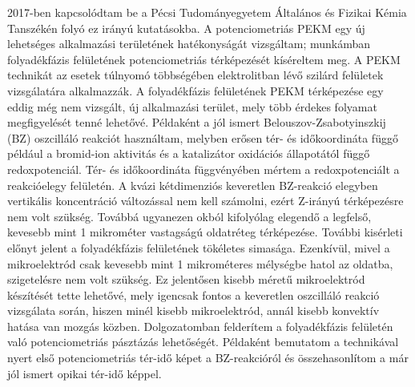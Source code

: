 2017-ben kapcsolódtam be a Pécsi Tudományegyetem Általános és Fizikai Kémia Tanszékén folyó ez irányú kutatásokba. A potenciometriás PEKM egy új lehetséges alkalmazási területének hatékonyságát vizsgáltam; munkámban folyadékfázis felületének potenciometriás térképezését kíséreltem meg. A PEKM technikát az esetek túlnyomó többségében elektrolitban lévő szilárd felületek vizsgálatára alkalmazzák. A folyadékfázis felületének PEKM térképezése egy eddig még nem vizsgált, új alkalmazási terület, mely több érdekes folyamat megfigyelését tenné lehetővé. Példaként a jól ismert Belouszov-Zsabotyinszkij (BZ) oszcilláló reakciót használtam, melyben erősen tér- és időkoordináta függő például a bromid-ion aktivitás és a katalizátor oxidációs állapotától függő redoxpotenciál. Tér- és időkoordináta függvényében mértem a redoxpotenciált a reakcióelegy felületén. A kvázi kétdimenziós keveretlen BZ-reakció elegyben vertikális koncentráció változással nem kell számolni, ezért Z-irányú térképezésre nem volt szükség. Továbbá ugyanezen okból kifolyólag elegendő a legfelső, kevesebb mint 1 mikrométer vastagságú oldatréteg térképezése. További kisérleti előnyt jelent a folyadékfázis felületének tökéletes simasága. Ezenkívül, mivel a mikroelektród csak kevesebb mint 1 mikrométeres mélységbe hatol az oldatba, szigetelésre nem volt szükség. Ez jelentősen kisebb méretű mikroelektród készítését tette lehetővé, mely igencsak fontos a keveretlen oszcilláló reakció vizsgálata során, hiszen minél kisebb mikroelektród, annál kisebb konvektív hatása van mozgás közben. Dolgozatomban felderítem a folyadékfázis felületén való potenciometriás pásztázás lehetőségét. Példaként bemutatom a technikával nyert első potenciometriás tér-idő képet a BZ-reakcióról és összehasonlítom a már jól ismert opikai tér-idő képpel.
